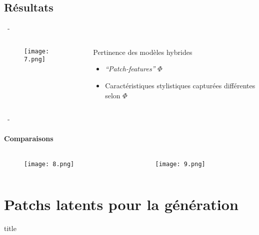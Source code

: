 \documentclass[aspectratio=169, 22pt]{beamer}
\begin{document}
\subsection{Résultats}
\begin{frame}{\secname~- \subsecname}
  \begin{columns}
    \begin{column}{0.5\linewidth}
      \begin{figure}
        \centering
        \texttt{[image: 7.png]}
      \end{figure}
    \end{column}
    \begin{column}{0.5\linewidth}
      \begin{block}{Pertinence des modèles hybrides}
        \begin{itemize}
        \item \emph{``Patch-features''} $\Phi$
        \item Caractéristiques stylistiques capturées différentes selon $\Phi$
        \end{itemize}
      \end{block}
    \end{column}
  \end{columns}
\end{frame}

\begin{frame}{\secname~- \subsecname}
  \framesubtitle{Comparaisons}
  \begin{columns}
    \begin{column}{0.5\linewidth}
      \begin{figure}
        \centering
        \texttt{[image: 8.png]}
      \end{figure}
    \end{column}
    \begin{column}{0.5\linewidth}
      \begin{figure}
        \centering
        \texttt{[image: 9.png]}
      \end{figure}
    \end{column}
  \end{columns}
\end{frame}



\section{Patchs latents pour la génération}
\begin{frame}
  \begin{beamercolorbox}[sep=15pt,center,shadow=true,rounded=true]{title}
    \LARGE\bfseries \secname
  \end{beamercolorbox}
\end{frame}
\end{document}
